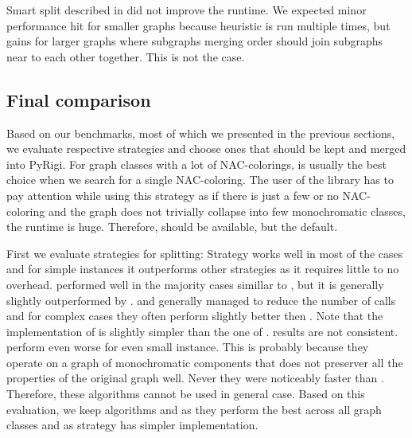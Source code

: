 Smart split described in 
did not improve the runtime.
We expected minor performance hit for smaller graphs because heuristic is run
multiple times, but gains for larger graphs where subgraphs merging order
should join subgraphs near to each other together. This is not the case.

\subsection{Final comparison}

Based on our benchmarks, most of which we presented in the previous sections,
we evaluate respective strategies and choose ones
that should be kept and merged into PyRigi.
For graph classes with a lot of NAC-colorings,
\NaiveCycles{} is usually the best choice
when we search for a single NAC-coloring.
%
The user of the library has to pay attention while using this strategy
as if there is just a few or no NAC-coloring and the graph does not trivially collapse
into few monochromatic classes, the runtime is huge.
Therefore, \NaiveCycles{} should be available, but the default.

First we evaluate strategies for splitting:
Strategy \None{} works well in most of the cases and for simple
instances it outperforms other strategies as it requires little to no overhead.
%
\CyclesMatchChunks{} performed well in the majority cases simillar to \None{},
but it is generally slightly outperformed by \Neighbors{}.
%
\Neighbors{} and \NeighborsDegree{} generally managed to reduce the number
of \IsNACColoring{} calls and for complex cases they often
perform slightly better then \None{}.
Note that the implementation of \Neighbors{} is slightly simpler than
the one of \NeighborsDegree{}.
%
\KernighanLin{} results are not consistent.
\Cuts{} perform even worse for even small instance.
This is probably because they operate on a graph of monochromatic
components that does not preserver all the properties
of the original graph well.
Never they were noticeably faster than \Neighbors{}.
Therefore, these algorithms cannot be used in general case.
%
Based on this evaluation, we keep algorithms \None{} and \Neighbors{}
as they perform the best across all graph classes and
as \Neighbors{} strategy has simpler implementation.

